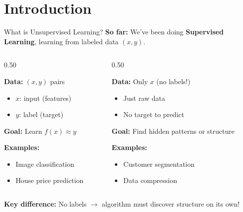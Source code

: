 \section{Introduction}
\begin{frame}{What is Unsupervised Learning?}
\textbf{So far:} We've been doing \textbf{Supervised Learning}, learning from labeled data $(x, y)$.

\vspace{1em}
\begin{columns}[c]
\begin{column}{0.50\textwidth}
\begin{tcolorbox}[colback=blue!5, colframe=blue!50, title=\textbf{Supervised Learning}]
\textbf{Data:} $(x, y)$ pairs
\begin{itemize}
\item $x$: input (features)
\item $y$: label (target)
\end{itemize}
\vspace{0.3em}
\textbf{Goal:} Learn $f(x) \approx y$

\textbf{Examples:}
\begin{itemize}
\item Image classification
\item House price prediction
\end{itemize}
\end{tcolorbox}
\end{column}

\begin{column}{0.50\textwidth}
\begin{tcolorbox}[colback=green!5, colframe=green!50!black, title=\textbf{Unsupervised Learning}]
\textbf{Data:} Only $x$ (no labels!)
\begin{itemize}
\item Just raw data
\item No target to predict
\end{itemize}
\vspace{0.3em}
\textbf{Goal:} Find hidden patterns or structure

\textbf{Examples:}
\begin{itemize}
\item Customer segmentation
\item Data compression
\end{itemize}
\end{tcolorbox}
\end{column}
\end{columns}

\vspace{1em}
\centering
\textbf{Key difference:} No labels $\rightarrow$ algorithm must discover structure on its own!
\end{frame}

